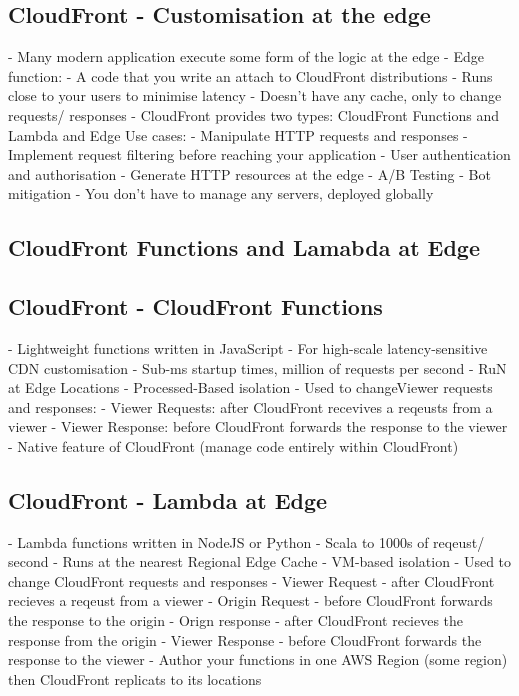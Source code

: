 \documentclass[11pt]{book}
\begin{document}
    \subsection{CloudFront - Customisation at the edge}
    - Many modern application execute some form of the logic at the edge
    - Edge function:
    - A code that you write an attach to CloudFront distributions
    - Runs close to your users to minimise latency
    - Doesn't have any cache, only to change requests/ responses
    - CloudFront provides two types: CloudFront Functions and Lambda and Edge
    Use cases:
    - Manipulate HTTP requests and responses
    - Implement request filtering before reaching your application
    - User authentication and authorisation
    - Generate HTTP resources at the edge
    - A/B Testing
    - Bot mitigation
    - You don't have to manage any servers, deployed globally

    \subsection{CloudFront Functions and Lamabda at Edge}

    \subsection{CloudFront - CloudFront Functions}
    - Lightweight functions written in JavaScript
    - For high-scale latency-sensitive CDN customisation
    - Sub-ms startup times, million of requests per second
    - RuN at Edge Locations
    - Processed-Based isolation
    - Used to changeViewer requests and responses:
    - Viewer Requests: after CloudFront recevives a reqeusts from a viewer
    - Viewer Response: before CloudFront forwards the response to the viewer
    - Native feature of CloudFront (manage code entirely within CloudFront)

    \subsection{CloudFront - Lambda at Edge}
    - Lambda functions written in NodeJS or Python
    - Scala to 1000s of reqeust/ second
    - Runs at the nearest Regional Edge Cache
    - VM-based isolation
    - Used to change CloudFront requests and responses
    - Viewer Request - after CloudFront recieves a reqeust from a viewer
    - Origin Request - before CloudFront forwards the response to the origin
    - Orign response - after CloudFront recieves the response from the origin
    - Viewer Response - before CloudFront forwards the response to the viewer
    - Author your functions in one AWS Region (some region) then CloudFront replicats to its locations
\end{document}

